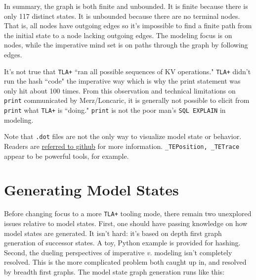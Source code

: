 \documentclass[twocolumn]{article}
\begin{document}
In summary, the graph is both finite and unbounded. It is finite because there is only 117 distinct states. It is unbounded because there are no terminal nodes. That is, all nodes have outgoing edges so it's impossible to find a finite path from the initial state to a node lacking outgoing edges. The modeling focus is on nodes, while the imperative mind set is on paths through the graph by following edges. 

It's not true that \texttt{TLA+} ``ran all possible sequences of KV operations." \texttt{TLA+} didn't run the hash ``code" the imperative way which is why the print statement was only hit about 100 times. From this observation and technical limitations on \texttt{print} communicated by Merz/Loncaric, it is generally not possible to elicit from \texttt{print} what \texttt{TLA+} is ``doing." \texttt{print} is not the poor man's \texttt{SQL EXPLAIN} in modeling.

Note that \texttt{.dot} files are not the only way to visualize model state or behavior. Readers are \href{https://github.com/tlaplus/tlaplus/issues/540}{referred to github} for more information. \texttt{\_TEPosition, \_TETrace} appear to be powerful tools, for example.

\section{Generating Model States}
Before changing focus to a more \texttt{TLA+} tooling mode, there remain two unexplored issues relative to model states. First, one should have passing knowledge on how model states are generated. It isn't hard: it's based on depth first graph generation of successor states. A toy, Python example is provided for hashing. Second, the dueling perspectives of imperative \emph{v.} modeling isn't completely resolved. This is the more complicated problem both caught up in, and resolved by breadth first graphs. The model state graph generation runs like this:
\end{document}
